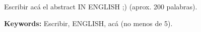 \chapter*{\runtitle}

\noindent Escribir acá el abstract IN ENGLISH ;) (aprox. 200 palabras).

\bigskip

\noindent\textbf{Keywords:} Escribir, ENGLISH, acá (no menos de 5).
